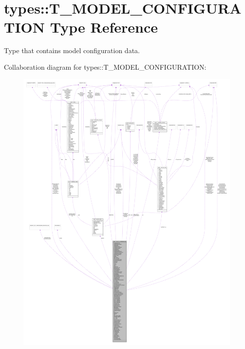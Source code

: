 \hypertarget{typetypes_1_1_t___m_o_d_e_l___c_o_n_f_i_g_u_r_a_t_i_o_n}{
\section{types::T\_\-MODEL\_\-CONFIGURATION Type Reference}
\label{typetypes_1_1_t___m_o_d_e_l___c_o_n_f_i_g_u_r_a_t_i_o_n}
}


Type that contains model configuration data.  




Collaboration diagram for types::T\_\-MODEL\_\-CONFIGURATION:\nopagebreak
\begin{figure}[H]
\begin{center}
\leavevmode
\includegraphics[width=400pt]{typetypes_1_1_t___m_o_d_e_l___c_o_n_f_i_g_u_r_a_t_i_o_n__coll__graph}
\end{center}
\end{figure}
